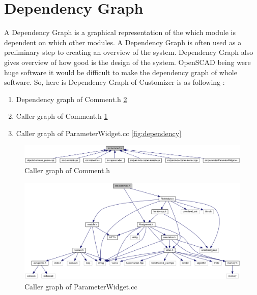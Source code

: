 \section{Dependency Graph}
A Dependency Graph is a graphical representation of the which module is dependent on which other modules. A Dependency Graph is often used as a preliminary step to creating an overview of the system. Dependency Graph also gives overview of how good is the design of the system.
OpenSCAD being were huge software it would be difficult to make the dependency graph of whole software. So, here is  Dependency Graph of Customizer is as following-:
\begin{enumerate}
\item Dependency graph of Comment.h \ref{fig:comment1}
\item Caller graph of Comment.h \ref{fig:comment}
\item Caller graph of ParameterWidget.cc \ref{fig:dependency}
\end{enumerate}

\begin{figure}[H]
\centering
\includegraphics[width=\linewidth]{images/comment}
\caption{Caller graph of Comment.h }
\label{fig:comment}
\end{figure}
\begin{figure}[H]
\centering
\includegraphics[width=\linewidth]{images/comment1}
\caption{Caller graph of ParameterWidget.cc}
\label{fig:comment1}
\end{figure}

